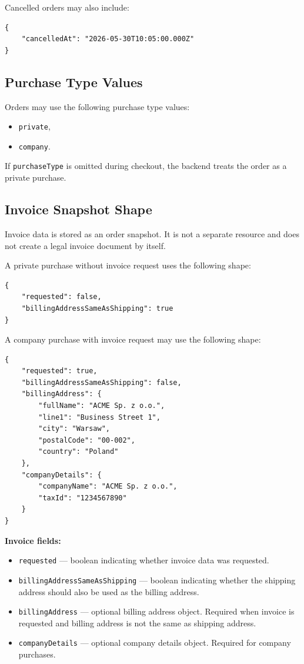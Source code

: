 Cancelled orders may also include:

\begin{verbatim}
{
    "cancelledAt": "2026-05-30T10:05:00.000Z"
}
\end{verbatim}

\subsection{Purchase Type Values}

Orders may use the following purchase type values:

\begin{itemize}
    \item \texttt{private},
    \item \texttt{company}.
\end{itemize}

If \texttt{purchaseType} is omitted during checkout, the backend treats the order as a private purchase.

\subsection{Invoice Snapshot Shape}

Invoice data is stored as an order snapshot. It is not a separate resource and does not create a legal invoice document by itself.

A private purchase without invoice request uses the following shape:

\begin{verbatim}
{
    "requested": false,
    "billingAddressSameAsShipping": true
}
\end{verbatim}

\pagebreak
A company purchase with invoice request may use the following shape:

\begin{verbatim}
{
    "requested": true,
    "billingAddressSameAsShipping": false,
    "billingAddress": {
        "fullName": "ACME Sp. z o.o.",
        "line1": "Business Street 1",
        "city": "Warsaw",
        "postalCode": "00-002",
        "country": "Poland"
    },
    "companyDetails": {
        "companyName": "ACME Sp. z o.o.",
        "taxId": "1234567890"
    }
}
\end{verbatim}

\textbf{Invoice fields:}

\begin{itemize}
    \item \texttt{requested} --- boolean indicating whether invoice data was requested.
    \item \texttt{billingAddressSameAsShipping} --- boolean indicating whether the shipping address should also be used as the billing address.
    \item \texttt{billingAddress} --- optional billing address object. Required when invoice is requested and billing address is not the same as shipping address.
    \item \texttt{companyDetails} --- optional company details object. Required for company purchases.
\end{itemize}

